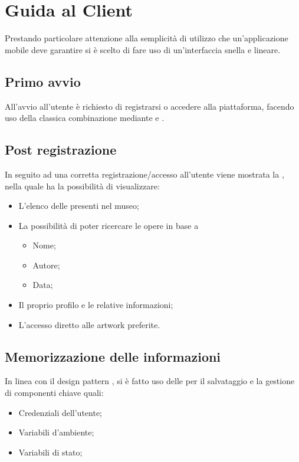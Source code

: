   \section{Guida al Client}
    Prestando particolare attenzione alla semplicità di utilizzo che un'applicazione mobile deve garantire si è scelto di fare uso di un’interfaccia snella e lineare.
    \subsection{Primo avvio}
      All'avvio all'utente è richiesto di registrarsi o accedere alla piattaforma, facendo uso della classica combinazione mediante  e .

    \subsection{Post registrazione}
      In seguito ad una corretta registrazione/accesso all'utente viene mostrata la , nella quale ha la possibilità di visualizzare:
      \begin{itemize}
        \item L'elenco delle  presenti nel museo;
        \item La possibilità di poter ricercare le opere in base a
          \begin{itemize}
            \item Nome;
            \item Autore;
            \item Data;
          \end{itemize}
        \item Il proprio profilo e le relative informazioni;
        \item L'accesso diretto alle artwork preferite.
      \end{itemize}
    \subsection{Memorizzazione delle informazioni}
    In linea con il design pattern  \footnotemark {}, si è fatto uso delle \href{https://developer.android.com/reference/android/content/SharedPreferences}{} per il salvataggio e la gestione di componenti chiave quali:
      \begin{itemize}
        \item Credenziali dell'utente;
        \item Variabili d'ambiente;
        \item Variabili di stato;
      \end{itemize}
    
